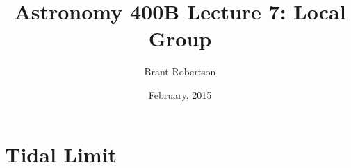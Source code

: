 \documentclass[]{article}
\title{Astronomy 400B Lecture 7: Local Group }
\author{Brant Robertson}
\date{February, 2015}
\begin{document}
\maketitle


\section{Tidal Limit}
\end{document}
